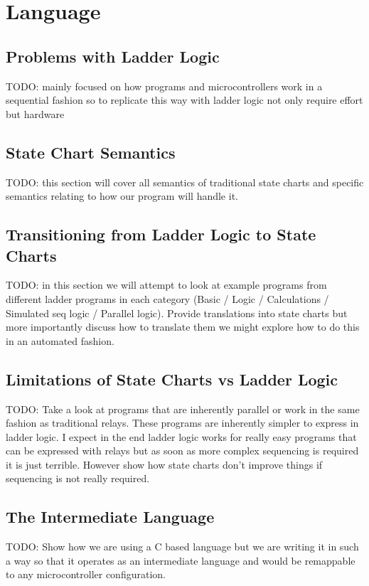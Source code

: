 \chapter{Language}
\section{Problems with Ladder Logic}
TODO: mainly focused on how programs and microcontrollers work in a sequential fashion so to replicate this way with ladder logic not only require effort but hardware
\section{State Chart Semantics}
TODO: this section will cover all semantics of traditional state charts and specific semantics relating to how our program will handle it.
\section{Transitioning from Ladder Logic to State Charts}
TODO: in this section we will attempt to look at example programs from different ladder programs in each category (Basic / Logic / Calculations / Simulated seq logic / Parallel logic). Provide translations into state charts but more importantly discuss how to translate them we might explore how to do this in an automated fashion.
\section{Limitations of State Charts vs Ladder Logic}
TODO: Take a look at programs that are inherently parallel or work in the same fashion as traditional relays. These programs are inherently simpler to express in ladder logic. I expect in the end ladder logic works for really easy programs that can be expressed with relays but as soon as more complex sequencing is required it is just terrible. However show how state charts don't improve things if sequencing is not really required.
\section{The Intermediate Language}
TODO: Show how we are using a C based language but we are writing it in such a way so that it operates as an intermediate language and would be remappable to any microcontroller configuration.